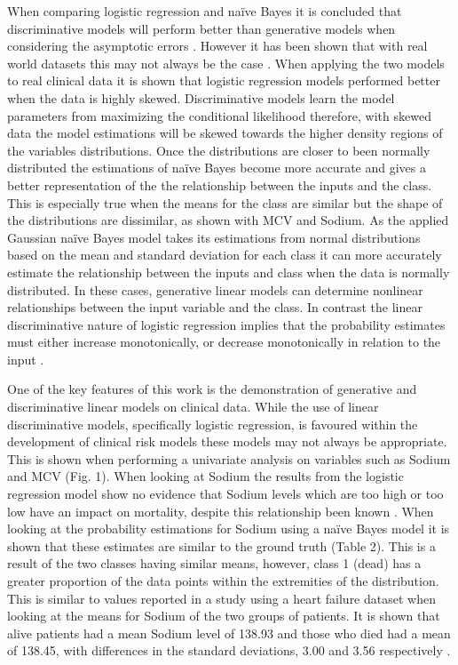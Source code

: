 \documentclass[a4paper,UKenglish]{oasics-v2016}
\begin{document}
When comparing logistic regression and naïve Bayes it is concluded that discriminative models will perform better than generative models when considering the asymptotic errors \cite{Ng2002}. However it has been shown that with real world datasets this may not always be the case \cite{Xue2008}. When applying the two models to real clinical data it is shown that logistic regression models performed better when the data is highly skewed. Discriminative models learn the model parameters from maximizing the conditional likelihood \cite{Xue2008} therefore, with skewed data the model estimations will be skewed towards the higher density regions of the variables distributions. Once the distributions are closer to been normally distributed the estimations of naïve Bayes become more accurate and gives a better representation of the the relationship between the inputs and the class. This is especially true when the means for the class are similar but the shape of the distributions are dissimilar, as shown with MCV and Sodium. As the applied Gaussian naïve Bayes model takes its estimations from normal distributions based on the mean and standard deviation for each class it can more accurately estimate the relationship between the inputs and class when the data is normally distributed. In these cases, generative linear models can determine nonlinear relationships between the input variable and the class. In contrast the linear discriminative nature of logistic regression implies that the probability estimates must either increase monotonically, or decrease monotonically in relation to the input \cite{Elkan2012}.

One of the key features of this work is the demonstration of generative and discriminative linear models on clinical data. While the use of linear discriminative models, specifically logistic regression, is favoured within the development of clinical risk models these models may not always be appropriate. This is shown when performing a univariate analysis on variables such as Sodium and MCV (Fig. 1). When looking at Sodium the results from the logistic regression model show no evidence that Sodium levels which are too high or too low have an impact on mortality, despite this relationship been known \cite{Bohacik2013}. When looking at the probability estimations for Sodium using a naïve Bayes model it is shown that these estimates are similar to the ground truth (Table 2). This is a result of the two classes having similar means, however, class 1 (dead) has a greater proportion of the data points within the extremities of the distribution. This is similar to values reported in a study using a heart failure dataset when looking at the means for Sodium of the two groups of patients. It is shown that alive patients had a mean Sodium level of 138.93 and those who died had a mean of 138.45, with differences in the standard deviations, 3.00 and 3.56 respectively \cite{Moore2015}.
\end{document}
